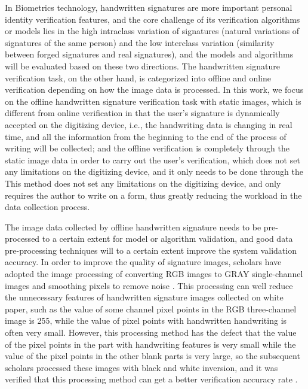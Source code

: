 In Biometrics technology, handwritten signatures are more important personal identity verification features, and the core challenge of its verification algorithms or models lies in the high intraclass variation of signatures (natural variations of signatures of the same person) and the low interclass variation (similarity between forged signatures and real signatures), and the models and algorithms will be evaluated based on these two directions. The handwritten signature verification task, on the other hand, is categorized into offline and online verification depending on how the image data is processed. In this work, we focus on the offline handwritten signature verification task with static images, which is different from online verification in that the user's signature is dynamically accepted on the digitizing device, i.e., the handwriting data is changing in real time, and all the information from the beginning to the end of the process of writing will be collected; and the offline verification is completely through the static image data in order to carry out the user's verification, which does not set any limitations on the digitizing device, and it only needs to be done through the This method does not set any limitations on the digitizing device, and only requires the author to write on a form, thus greatly reducing the workload in the data collection process.

The image data collected by offline handwritten signature needs to be pre-processed to a certain extent for model or algorithm validation, and good data pre-processing techniques will to a certain extent improve the system validation accuracy. In order to improve the quality of signature images, scholars have adopted the image processing of converting RGB images to GRAY single-channel images and smoothing pixels to remove noise \cite{40}. This processing can well reduce the unnecessary features of handwritten signature images collected on white paper, such as the value of some channel pixel points in the RGB three-channel image is 255, while the value of pixel points with handwritten handwriting is often very small. However, this processing method has the defect that the value of the pixel points in the part with handwriting features is very small while the value of the pixel points in the other blank parts is very large, so the subsequent scholars processed these images with black and white inversion, and it was verified that this processing method can get a better verification accuracy rate \cite{11}.

